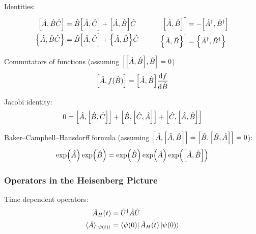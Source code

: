 			\noindent
			Identities:
			\begin{equation}
				\begin{aligned}
					\comm{\hat{A}}{\hat{B}\hat{C}}
					&= \hat{B}\comm{\hat{A}}{\hat{C}} + \comm{\hat{A}}{\hat{B}}\hat{C} \\
					\acomm{\hat{A}}{\hat{B}\hat{C}}
					&= \hat{B}\comm{\hat{A}}{\hat{C}} + \acomm{\hat{A}}{\hat{B}}\hat{C} \\
				\end{aligned}
				\hsp
				\begin{aligned}
					\comm{\hat{A}}{\hat{B}}^\dagger &= -\comm{\hat{A}^\dagger}{\hat{B}^\dagger} \\
					\acomm{\hat{A}}{\hat{B}}^\dagger &= \acomm{\hat{A}^\dagger}{\hat{B}^\dagger} \\
				\end{aligned}
			\end{equation}

			\noindent
			Commutators of functions (assuming $\comm{\comm{\hat{A}}{\hat{B}}}{\hat{B}}=0$)
			\begin{equation}
				\comm{\hat{A}}{f(\hat{B})}
				= \comm{\hat{A}}{\hat{B}}\dv{f}{\hat{B}}(\hat{B}) \\
			\end{equation}

			\noindent
			Jacobi identity:
			\begin{equation}
				0 = \comm{\hat{A}}{\comm{\hat{B}}{\hat{C}}} + \comm{\hat{B}}{\comm{\hat{C}}{\hat{A}}} + \comm{\hat{C}}{\comm{\hat{A}}{\hat{B}}}
			\end{equation}


			\noindent
			Baker--Campbell--Hausdorff formula (assuming $\comm{\hat{A}}{\comm{\hat{A}}{\hat{B}}} = \comm{\hat{B}}{\comm{\hat{B}}{\hat{A}}} = 0$):
			\begin{equation}
				\exp(\hat{A})\exp(\hat{B}) = \exp(\hat{B}) \exp(\hat{A}) \exp(\comm{\hat{A}}{\hat{B}})
			\end{equation}

		\subsubsection{Operators in the Heisenberg Picture}
			\noindent
			Time dependent operators:
			\begin{equation}
				\begin{aligned}
					\hat{A}_H(t) &= \hat{U}^\dagger \hat{A} \hat{U} \\
					\langle \hat{A} \rangle_{\Ket{\psi(t)}} &= \Bra{\psi(0)}\hat{A}_H(t)\Ket{\psi(0)}
				\end{aligned}
			\end{equation}

